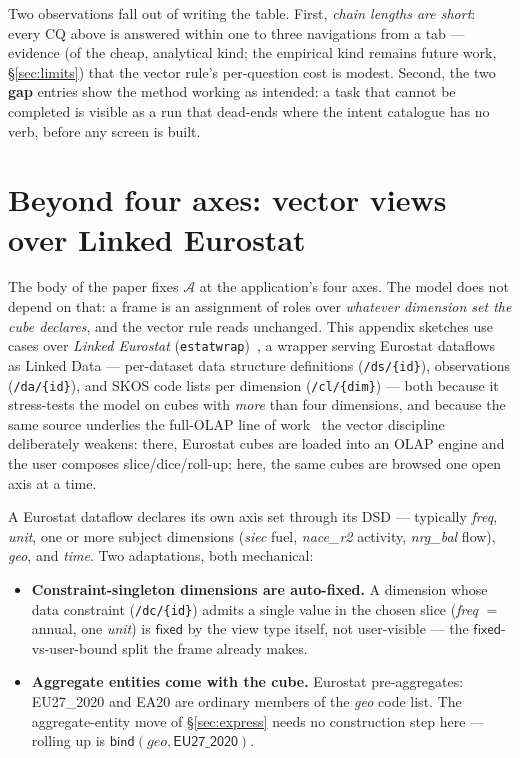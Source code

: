 \documentclass[11pt,a4paper]{article}
\theoremstyle{remark}
\newcommand{\Ax}{\mathcal{A}}                    %
\newcommand{\fixed}{\mathsf{fixed}}
\newcommand{\vbind}{\mathsf{bind}}
\begin{document}
Two observations fall out of writing the table. First, \emph{chain lengths are
short}: every CQ above is answered within one to three navigations from a tab
--- evidence (of the cheap, analytical kind; the empirical kind remains future
work, \S\ref{sec:limits}) that the vector rule's per-question cost is modest.
Second, the two \textbf{gap} entries show the method working as intended: a task
that cannot be completed is visible as a run that dead-ends where the intent
catalogue has no verb, before any screen is built.


\cleardoublepage
\section{Beyond four axes: vector views over Linked Eurostat}\label{app:eurostat}

The body of the paper fixes $\Ax$ at the application's four axes. The model does
not depend on that: a frame is an assignment of roles over \emph{whatever
dimension set the cube declares}, and the vector rule reads unchanged. This
appendix sketches use cases over \emph{Linked Eurostat}
(\texttt{estatwrap})~\cite{estatwrap}, a wrapper serving Eurostat dataflows as
Linked Data --- per-dataset data structure definitions (\texttt{/ds/\{id\}}),
observations (\texttt{/da/\{id\}}), and SKOS code lists per dimension
(\texttt{/cl/\{dim\}}) --- both because it stress-tests the model on cubes with
\emph{more} than four dimensions, and because the same source underlies the
full-OLAP line of work~\cite{kaempgen2011,kaempgen2012} the vector discipline
deliberately weakens: there, Eurostat cubes are loaded into an OLAP engine and
the user composes slice/dice/roll-up; here, the same cubes are browsed one open
axis at a time.

A Eurostat dataflow declares its own axis set through its DSD --- typically
\textit{freq}, \textit{unit}, one or more subject dimensions (\textit{siec}
fuel, \textit{nace\_r2} activity, \textit{nrg\_bal} flow), \textit{geo}, and
\textit{time}. Two adaptations, both mechanical:

\begin{itemize}
\item \textbf{Constraint-singleton dimensions are auto-fixed.} A dimension whose
  data constraint (\texttt{/dc/\{id\}}) admits a single value in the chosen
  slice (\textit{freq} $=$ annual, one \textit{unit}) is $\fixed$ by the view
  type itself, not user-visible --- the $\fixed$-vs-user-bound split the frame
  already makes.
\item \textbf{Aggregate entities come with the cube.} Eurostat pre-aggregates:
  \textsf{EU27\_2020} and \textsf{EA20} are ordinary members of the \textit{geo}
  code list. The aggregate-entity move of \S\ref{sec:express} needs no
  construction step here --- rolling up is $\vbind(\mathit{geo},
  \textsf{EU27\_2020})$.
\end{itemize}
\end{document}
